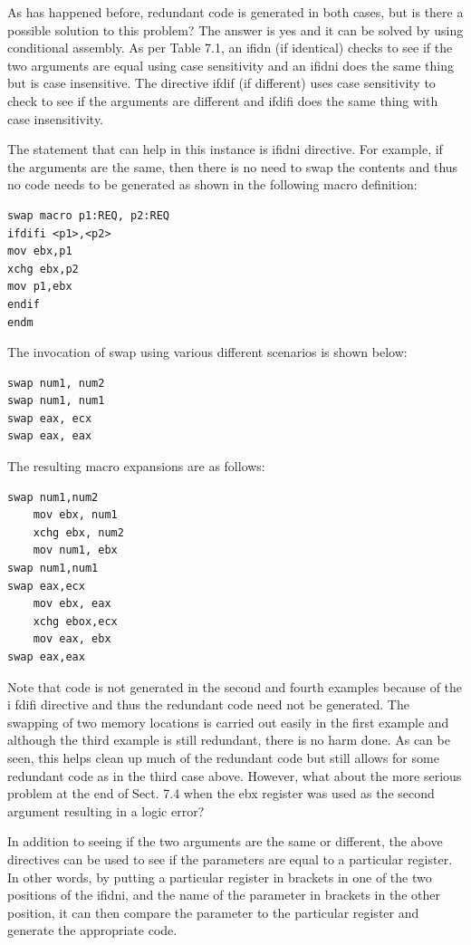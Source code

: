 \documentclass[10pt]{book}
\begin{document}
As has happened before, redundant code is generated in both cases, but is there a possible solution to this problem? The answer is yes and it can be solved by using conditional assembly. As per Table 7.1, an ifidn (if identical) checks to see if the two arguments are equal using case sensitivity and an ifidni does the same thing but is case insensitive. The directive ifdif (if different) uses case sensitivity to check to see if the arguments are different and ifdifi does the same thing with case insensitivity.

The statement that can help in this instance is ifidni directive. For example, if the arguments are the same, then there is no need to swap the contents and thus no code needs to be generated as shown in the following macro definition:

\begin{verbatim}
swap macro p1:REQ, p2:REQ
ifdifi <p1>,<p2>
mov ebx,p1
xchg ebx,p2
mov p1,ebx
endif
endm
\end{verbatim}

The invocation of swap using various different scenarios is shown below:

\begin{verbatim}
swap num1, num2
swap num1, num1
swap eax, ecx
swap eax, eax
\end{verbatim}

The resulting macro expansions are as follows:

\begin{verbatim}
swap num1,num2
    mov ebx, num1
    xchg ebx, num2
    mov num1, ebx
swap num1,num1
swap eax,ecx
    mov ebx, eax
    xchg ebox,ecx
    mov eax, ebx
swap eax,eax
\end{verbatim}

Note that code is not generated in the second and fourth examples because of the i fdifi directive and thus the redundant code need not be generated. The swapping of two memory locations is carried out easily in the first example and although the third example is still redundant, there is no harm done. As can be seen, this helps clean up much of the redundant code but still allows for some redundant code as in the third case above. However, what about the more serious problem at the end of Sect. 7.4 when the ebx register was used as the second argument resulting in a logic error?

In addition to seeing if the two arguments are the same or different, the above directives can be used to see if the parameters are equal to a particular register. In other words, by putting a particular register in brackets in one of the two positions of the ifidni, and the name of the parameter in brackets in the other position, it can then compare the parameter to the particular register and generate the appropriate code.
\end{document}
